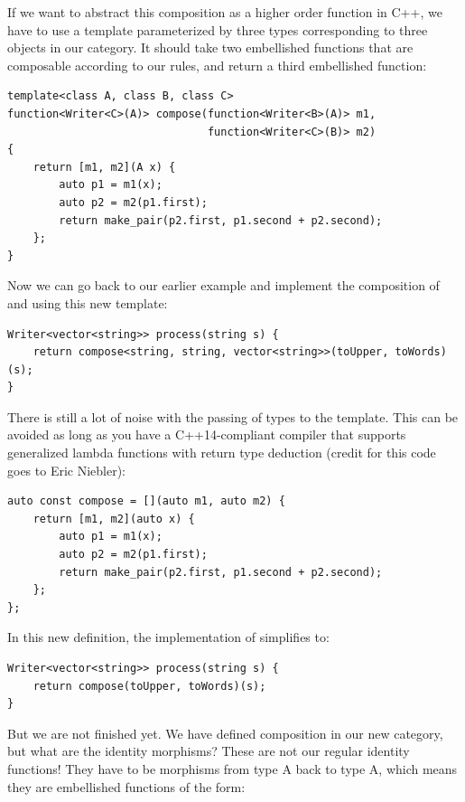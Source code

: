 If we want to abstract this composition as a higher order function in
C++, we have to use a template parameterized by three types
corresponding to three objects in our category. It should take two
embellished functions that are composable according to our rules, and
return a third embellished function:

\begin{Verbatim}[commandchars=\\\{\}]
template<class A, class B, class C>
function<Writer<C>(A)> compose(function<Writer<B>(A)> m1,
                               function<Writer<C>(B)> m2)
{
    return [m1, m2](A x) {
        auto p1 = m1(x);
        auto p2 = m2(p1.first);
        return make_pair(p2.first, p1.second + p2.second); 
    };
}
\end{Verbatim}
Now we can go back to our earlier example and implement the composition
of  and  using this new template:

\begin{verbatim}
Writer<vector<string>> process(string s) { 
    return compose<string, string, vector<string>>(toUpper, toWords)(s);
}
\end{verbatim}
There is still a lot of noise with the passing of types to the
 template. This can be avoided as long as you have a
C++14-compliant compiler that supports generalized lambda functions with
return type deduction (credit for this code goes to Eric Niebler):

\begin{Verbatim}[commandchars=\\\{\}]
auto const compose = [](auto m1, auto m2) { 
    return [m1, m2](auto x) { 
        auto p1 = m1(x);
        auto p2 = m2(p1.first);
        return make_pair(p2.first, p1.second + p2.second);
    };
};
\end{Verbatim}
In this new definition, the implementation of 
simplifies to:

\begin{Verbatim}[commandchars=\\\{\}]
Writer<vector<string>> process(string s) {
    return compose(toUpper, toWords)(s);
}
\end{Verbatim}
But we are not finished yet. We have defined composition in our new
category, but what are the identity morphisms? These are not our regular
identity functions! They have to be morphisms from type A back to type
A, which means they are embellished functions of the form:

